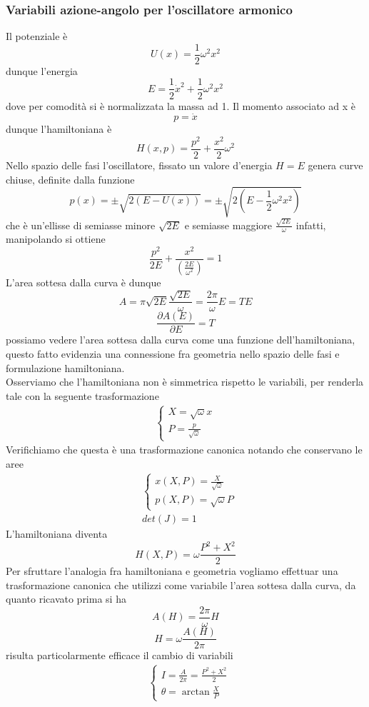 \documentclass[
10pt, %
a4paper, %
oneside, %
headinclude,footinclude, %
BCOR5mm, %
]{scrartcl}
\begin{document}
\subsubsection{Variabili azione-angolo per l'oscillatore armonico}
Il potenziale è
\[U(x) = \frac{1}{2}\omega^2x^2\]
dunque l'energia
\[E = \frac{1}{2}\dot{x}^2+\frac{1}{2}\omega^2x^2\]
dove per comodità si è normalizzata la massa ad 1. Il momento associato ad x è
\[p = \dot{x}\]
dunque l'hamiltoniana è
\[H(x, p) = \frac{p^2}{2}+\frac{x^2}{2}\omega^2\]
Nello spazio delle fasi l'oscillatore, fissato un valore d'energia \(H = E\) genera curve chiuse, definite dalla funzione 
\[p(x) = \pm\sqrt{2(E-U(x))} = \pm\sqrt{2(E-\frac{1}{2}\omega^2x^2)}\]
che è un'ellisse di semiasse minore $\sqrt{2E}$ e semiasse maggiore \(\frac{\sqrt{2E}}{\omega}\) infatti, manipolando si ottiene
\[\frac{p^2}{2E}+\frac{x^2}{\left(\frac{2E}{\omega^2}\right)} = 1\]
L'area sottesa dalla curva è dunque
\[A = \pi\sqrt{2E}\frac{\sqrt{2E}}{\omega}=\frac{2\pi}{\omega}E = TE\]
\[\frac{\partial A(E)}{\partial E} = T\]
possiamo vedere l'area sottesa dalla curva come una funzione dell'hamiltoniana, questo fatto evidenzia una connessione fra geometria nello spazio delle fasi e formulazione hamiltoniana.\\
Osserviamo che l'hamiltoniana non è simmetrica rispetto le variabili, per renderla tale con la seguente trasformazione
\begin{align*}
	\begin{cases}
		X = \sqrt{\omega} x\\
		P = \frac{p}{\sqrt{\omega}}
	\end{cases}
\end{align*}
Verifichiamo che questa è una trasformazione canonica notando che conservano le aree
\begin{align*}
	&\begin{cases}
		x(X, P) = \frac{X}{\sqrt{\omega}}\\
		p(X, P) = \sqrt{\omega}P
	\end{cases}\\
	&det(J) = 1
\end{align*}
L'hamiltoniana diventa
\[H(X, P) = \omega\frac{P^2+X^2}{2}\]
Per sfruttare l'analogia fra hamiltoniana e geometria vogliamo effettuar una trasformazione canonica che utilizzi come variabile l'area sottesa dalla curva, da quanto ricavato prima si ha
\[A(H) = \frac{2\pi}{\omega}H\]
\[H = {\omega}\frac{A(H)}{2\pi}\]
risulta particolarmente efficace il cambio di variabili
\begin{align*}
	&\begin{cases}
		I = \frac{A}{2\pi} = \frac{P^2+X^2}{2}\\
		\theta= \arctan\frac{X}{P}
	\end{cases}
\end{align*}
\end{document}
